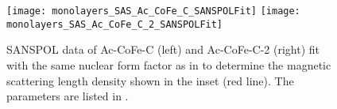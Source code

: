 \documentclass[\main/dresen_thesis.tex]{subfiles}
\begin{document}
    \begin{figure}[tb]
      \centering
      \texttt{[image: monolayers\_SAS\_Ac\_CoFe\_C\_SANSPOLFit]}
      \texttt{[image: monolayers\_SAS\_Ac\_CoFe\_C\_2\_SANSPOLFit]}
      \caption{\label{fig:monolayers:nanoparticle:sans:superballAcAcFit}SANSPOL data of Ac-CoFe-C (left) and Ac-CoFe-C-2 (right) fit with the same nuclear form factor as in  to determine the magnetic scattering length density  shown in the inset (red line). The parameters are listed in .}
    \end{figure}

\end{document}
